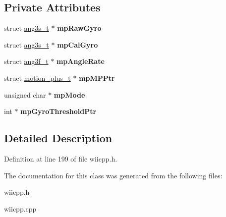 \subsection*{\-Private \-Attributes}
\begin{DoxyCompactItemize}
\item 
\hypertarget{class_c_gyroscope_a87e3c3237cf9aa647616a3c6a67383d4}{struct \hyperlink{structang3s__t}{ang3s\-\_\-t} $\ast$ {\bfseries mp\-Raw\-Gyro}}\label{class_c_gyroscope_a87e3c3237cf9aa647616a3c6a67383d4}

\item 
\hypertarget{class_c_gyroscope_aa97fedb5d9e31d7e6cc490b93cdf10be}{struct \hyperlink{structang3s__t}{ang3s\-\_\-t} $\ast$ {\bfseries mp\-Cal\-Gyro}}\label{class_c_gyroscope_aa97fedb5d9e31d7e6cc490b93cdf10be}

\item 
\hypertarget{class_c_gyroscope_ad854fd374a9b1bf8583c5c8442f9eb82}{struct \hyperlink{structang3f__t}{ang3f\-\_\-t} $\ast$ {\bfseries mp\-Angle\-Rate}}\label{class_c_gyroscope_ad854fd374a9b1bf8583c5c8442f9eb82}

\item 
\hypertarget{class_c_gyroscope_a2529dbb80ed6023c5def2da858fa604b}{struct \hyperlink{structmotion__plus__t}{motion\-\_\-plus\-\_\-t} $\ast$ {\bfseries mp\-M\-P\-Ptr}}\label{class_c_gyroscope_a2529dbb80ed6023c5def2da858fa604b}

\item 
\hypertarget{class_c_gyroscope_a13027f2e9c9df3b0141b44e8704ca99c}{unsigned char $\ast$ {\bfseries mp\-Mode}}\label{class_c_gyroscope_a13027f2e9c9df3b0141b44e8704ca99c}

\item 
\hypertarget{class_c_gyroscope_ab3dad4aa924f4e2127116e5b236e4897}{int $\ast$ {\bfseries mp\-Gyro\-Threshold\-Ptr}}\label{class_c_gyroscope_ab3dad4aa924f4e2127116e5b236e4897}

\end{DoxyCompactItemize}


\subsection{\-Detailed \-Description}


\-Definition at line 199 of file wiicpp.\-h.



\-The documentation for this class was generated from the following files\-:\begin{DoxyCompactItemize}
\item 
wiicpp.\-h\item 
wiicpp.\-cpp\end{DoxyCompactItemize}
